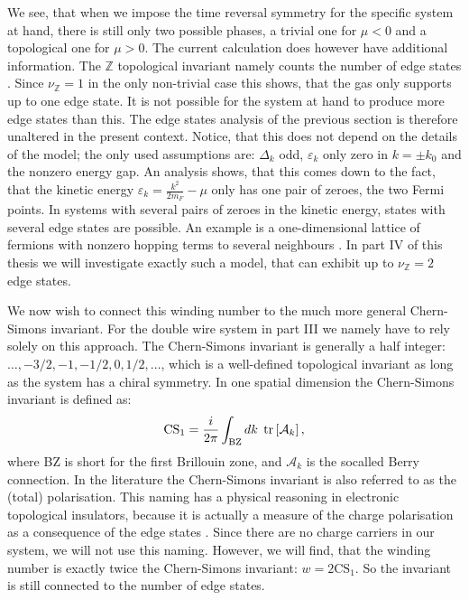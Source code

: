 We see, that when we impose the time reversal symmetry for the specific system at hand, there is still only two possible phases, a trivial one for $\mu < 0$ and a topological one for $\mu > 0$. The current calculation does however have additional information. The $\mathbb{Z}$ topological invariant namely counts the number of edge states \cite{Chiu.Topology}. Since $\nu_{\mathbb{Z}} = 1$ in the only non-trivial case this shows, that the gas only supports up to one edge state. It is not possible for the system at hand to produce more edge states than this. The edge states analysis of the previous section is therefore unaltered in the present context. Notice, that this does not depend on the details of the model; the only used assumptions are: $\Delta_k$ odd, $\varepsilon_k$ only zero in $k = \pm k_0$ and the nonzero energy gap. An analysis shows, that this comes down to the fact, that the kinetic energy $\varepsilon_k = \frac{k^2}{2m_F} - \mu$ only has one pair of zeroes, the two Fermi points. In systems with several pairs of zeroes in the kinetic energy, states with several edge states are possible. An example is a one-dimensional lattice of fermions with nonzero hopping terms to several neighbours \cite{Alecce.extendKitaev}. In part IV of this thesis we will investigate exactly such a model, that can exhibit up to $\nu_{\mathbb{Z}} = 2$ edge states. 

We now wish to connect this winding number to the much more general Chern-Simons invariant. For the double wire system in part III we namely have to rely solely on this approach. The Chern-Simons invariant is generally a half integer: $\dots, -3/2, -1, -1/2, 0, 1/2, \dots$, which is a well-defined topological invariant as long as the system has a chiral symmetry. In one spatial dimension the Chern-Simons invariant is defined as:
\begin{equation}
\text{CS}_1 = \frac{i}{2\pi}\int_{\text{BZ}}dk \; \operatorname{tr}\left[\mathcal{A}_k\right],
\label{eq.definition.CS1}
\end{equation}
where BZ is short for the first Brillouin zone, and $\mathcal{A}_k$ is the socalled Berry connection. In the literature the Chern-Simons invariant is also referred to as the (total) polarisation. This naming has a physical reasoning in electronic topological insulators, because it is actually a measure of the charge polarisation as a consequence of the edge states \cite{FuKane2006}. Since there are no charge carriers in our system, we will not use this naming. However, we will find, that the winding number is exactly twice the Chern-Simons invariant: $w = 2\text{CS}_1$. So the invariant is still connected to the number of edge states. 

